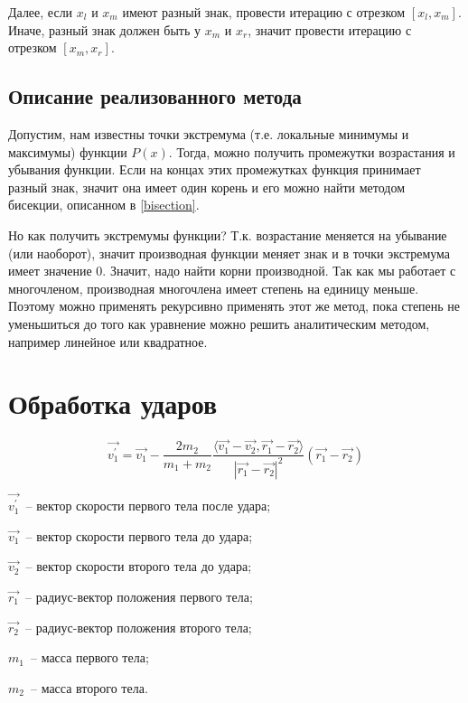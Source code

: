 Далее, если \(x_l\) и \(x_m\) имеют разный знак, провести итерацию с отрезком \([x_l, x_m]\).
Иначе, разный знак должен быть у  \(x_m\) и \(x_r\), значит провести итерацию с отрезком \([x_m, x_r]\).

\subsection{Описание реализованного метода}\label{polynomialequation}

Допустим, нам известны точки экстремума (т.е. локальные минимумы и максимумы) функции \(P(x)\).
Тогда, можно получить промежутки возрастания и убывания функции.
Если на концах этих промежутках функция принимает разный знак,
значит она имеет один корень и его можно найти методом бисекции, описанном в \ref{bisection}.

Но как получить экстремумы функции? Т.к. возрастание меняется на убывание (или наоборот),
значит производная функции меняет знак и в точки экстремума имеет значение \(0\).
Значит, надо найти корни производной. Так как мы работает с многочленом, производная многочлена
имеет степень на единицу меньше. Поэтому можно применять рекурсивно применять этот же метод,
пока степень не уменьшиться до того как уравнение можно решить аналитическим методом,
например линейное или квадратное.

\section{Обработка ударов}

\TODO

\begin{equation}\label{collisionhandle}
  \vec{v_1^\prime} = \vec{v_1} - \frac{2 m_2}{m_1 + m_2}
  \frac{\langle \vec{v_1} - \vec{v_2}, \vec{r_1} - \vec{r_2} \rangle }{\left| \vec{r_1} - \vec{r_2} \right|^2}
  (\vec{r_1} - \vec{r_2})
\end{equation}

\begin{Underequation}
  \(\vec{v_1^\prime}\)~-- вектор скорости первого тела после удара;

  \(\vec{v_1}\)~-- вектор скорости первого тела до удара;

  \(\vec{v_2}\)~-- вектор скорости второго тела до удара;

  \(\vec{r_1}\)~-- радиус-вектор положения первого тела;

  \(\vec{r_2}\)~-- радиус-вектор положения второго тела;

  \(m_1\)~-- масса первого тела;

  \(m_2\)~-- масса второго тела.
\end{Underequation}

